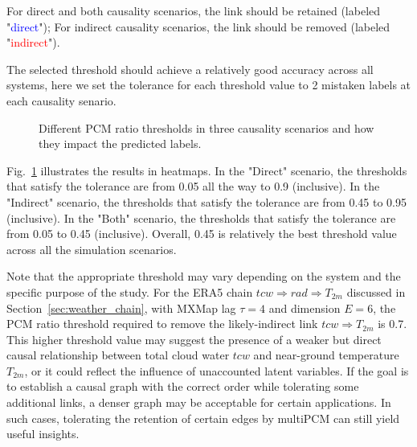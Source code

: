 For direct and both causality scenarios, the link should be retained (labeled "\textcolor{blue}{direct}"); For indirect causality scenarios, the link should be removed (labeled "\textcolor{red}{indirect}"). 

The selected threshold should achieve a relatively good accuracy across all systems, here we set the tolerance for each threshold value to 2 mistaken labels at each causality senario.


\begin{figure}[htb]
    \centering

    \hfill
    \hfill
    \caption{Different PCM ratio thresholds in three causality scenarios and how they impact the predicted labels.}
    \label{appfig:noNoise-pcmThres}
\end{figure}

Fig.~\ref{appfig:noNoise-pcmThres} illustrates the results in heatmaps. In the "Direct" scenario, the thresholds that satisfy the tolerance are from 0.05 all the way to 0.9 (inclusive). In the "Indirect" scenario, the thresholds that satisfy the tolerance are from 0.45 to 0.95 (inclusive). In the "Both" scenario, the thresholds that satisfy the tolerance are from 0.05 to 0.45 (inclusive). Overall, 0.45 is relatively the best threshold value across all the simulation scenarios. 

Note that the appropriate threshold may vary depending on the system and the specific purpose of the study. For the ERA5 chain $tcw \Rightarrow rad \Rightarrow  T_{2m}$ discussed in Section~\ref{sec:weather_chain}, with MXMap lag $\tau=4$ and dimension $E=6$, the PCM ratio threshold required to remove the likely-indirect link $tcw\Rightarrow T_{2m}$ is 0.7. This higher threshold value may suggest the presence of a weaker but direct causal relationship between total cloud water $tcw$ and near-ground temperature $T_{2m}$, or it could reflect the influence of unaccounted latent variables. If the goal is to establish a causal graph with the correct order while tolerating some additional links, a denser graph may be acceptable for certain applications. In such cases, tolerating the retention of certain edges by multiPCM can still yield useful insights.


